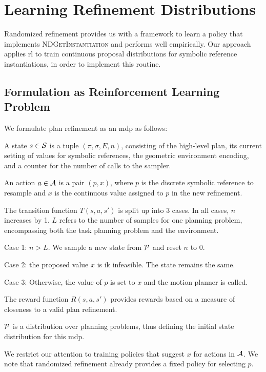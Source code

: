 \section{Learning Refinement Distributions}
Randomized refinement provides us with a framework to learn a policy that implements
\textsc{NDGetInstantiation} and performs well empirically. Our approach applies {\sc rl}
to train continuous proposal distributions for symbolic reference instantiations, in order
to implement this routine.

\subsection{Formulation as Reinforcement Learning Problem}
We formulate plan refinement as an {\sc mdp} as follows:
\begin{tightlist}
\item A state $s \in \mathcal{S}$ is a tuple $(\pi, \sigma, E, n)$, consisting of the
high-level plan, its current setting of values for symbolic references,
the geometric environment encoding, and a counter for
the number of calls to the sampler.
\item An action $a \in \mathcal{A}$ is a pair $(p, x)$, where $p$ is the discrete symbolic
reference to resample and $x$ is the continuous value assigned to $p$ in the new refinement.
\item The transition function $T(s, a, s')$ is split up into 3 cases. In all cases, $n$ increases by 1. $L$ refers to
the number of samples for one planning problem, encompassing both the task planning problem
and the environment.
  \begin{tightlist}
  \item Case 1: $n > L$. We sample a new state from $\mathcal{P}$ and reset $n$ to 0.
  \item Case 2: the proposed value $x$ is {\sc ik} infeasible. The state remains the same.
  \item Case 3: Otherwise, the value of $p$ is set to $x$ and the motion planner is called.
  \end{tightlist}
\item The reward function $R(s, a, s')$ provides rewards based on a measure of closeness to a valid plan refinement.
\item $\mathcal{P}$ is a distribution over planning problems, thus defining the initial state distribution for this {\sc mdp}.
\end{tightlist}

We restrict our attention to training policies that suggest $x$ for actions in $\mathcal{A}$.
We note that randomized refinement already provides a fixed policy for selecting $p$.

